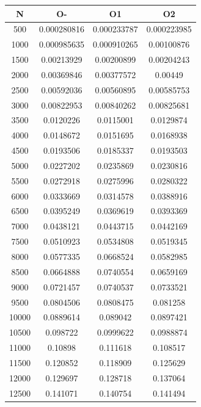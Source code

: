 \begin{center}
\begin{tabular}{| c | c | c | c |}
\hline
\textbf{N} & \textbf{O-} & \textbf{O1} & \textbf{O2} \\ \hline
500 & 0.000280816 & 0.000233787 & 0.000223985 \\ \hline
1000 & 0.000985635 & 0.000910265 & 0.00100876 \\ \hline
1500 & 0.00213929 & 0.00200899 & 0.00204243 \\ \hline
2000 & 0.00369846 & 0.00377572 & 0.00449 \\ \hline
2500 & 0.00592036 & 0.00560895 & 0.00585753 \\ \hline
3000 & 0.00822953 & 0.00840262 & 0.00825681 \\ \hline
3500 & 0.0120226 & 0.0115001 & 0.0129874 \\ \hline
4000 & 0.0148672 & 0.0151695 & 0.0168938 \\ \hline
4500 & 0.0193506 & 0.0185337 & 0.0193503 \\ \hline
5000 & 0.0227202 & 0.0235869 & 0.0230816 \\ \hline
5500 & 0.0272918 & 0.0275996 & 0.0280322 \\ \hline
6000 & 0.0333669 & 0.0314578 & 0.0388916 \\ \hline
6500 & 0.0395249 & 0.0369619 & 0.0393369 \\ \hline
7000 & 0.0438121 & 0.0443715 & 0.0442169 \\ \hline
7500 & 0.0510923 & 0.0534808 & 0.0519345 \\ \hline
8000 & 0.0577335 & 0.0668524 & 0.0582985 \\ \hline
8500 & 0.0664888 & 0.0740554 & 0.0659169 \\ \hline
9000 & 0.0721457 & 0.0740537 & 0.0733521 \\ \hline
9500 & 0.0804506 & 0.0808475 & 0.081258 \\ \hline
10000 & 0.0889614 & 0.089042 & 0.0897421 \\ \hline
10500 & 0.098722 & 0.0999622 & 0.0988874 \\ \hline
11000 & 0.10898 & 0.111618 & 0.108517 \\ \hline
11500 & 0.120852 & 0.118909 & 0.125629 \\ \hline
12000 & 0.129697 & 0.128718 & 0.137064 \\ \hline
12500 & 0.141071 & 0.140754 & 0.141494 \\ \hline
\hline
\end{tabular}
\end{center}
